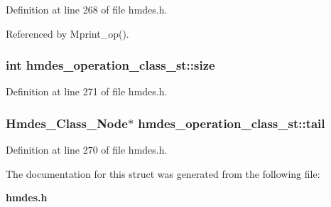Definition at line 268 of file hmdes.h.

Referenced by Mprint\_\-op().
\subsubsection{\setlength{\rightskip}{0pt plus 5cm}int \bf{hmdes\_\-operation\_\-class\_\-st::size}}\label{structhmdes__operation__class__st_bbad0e6f8b200580b0cfba1ea7a1c053}




Definition at line 271 of file hmdes.h.
\subsubsection{\setlength{\rightskip}{0pt plus 5cm}\bf{Hmdes\_\-Class\_\-Node}$\ast$ \bf{hmdes\_\-operation\_\-class\_\-st::tail}}\label{structhmdes__operation__class__st_0428162e3ea196f0a64e89fcd20c1680}




Definition at line 270 of file hmdes.h.

The documentation for this struct was generated from the following file:\begin{CompactItemize}
\item 
\bf{hmdes.h}\end{CompactItemize}

